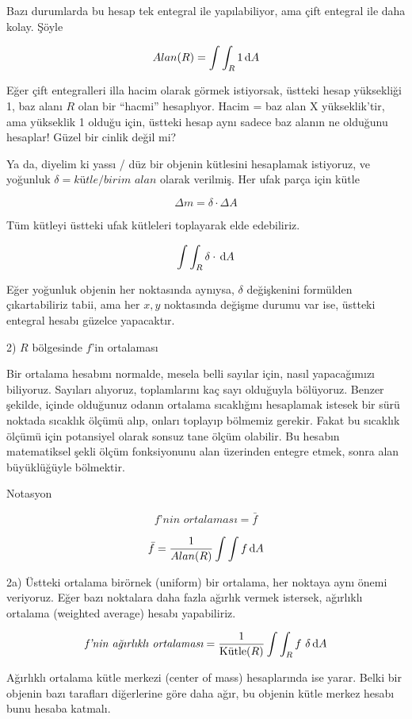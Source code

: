 \documentclass[12pt,fleqn]{article}\usepackage{../../common}
\begin{document}
Bazı durumlarda bu hesap tek entegral ile yapılabiliyor, ama çift entegral ile
daha kolay. Şöyle

$$ Alan(R) = \int \int_R 1 \,\mathrm{d} A $$

Eğer çift entegralleri illa hacim olarak görmek istiyorsak, üstteki hesap
yüksekliği 1, baz alanı $R$ olan bir ``hacmi'' hesaplıyor. Hacim = baz alan X
yükseklik'tir, ama yükseklik 1 olduğu için, üstteki hesap aynı sadece baz alanın
ne olduğunu hesaplar! Güzel bir cinlik değil mi?

Ya da, diyelim ki yassı / düz bir objenin kütlesini hesaplamak istiyoruz, ve
yoğunluk $\delta = \textit{kütle} / \textit{birim alan}$ olarak verilmiş. Her
ufak parça için kütle

$$ \Delta m = \delta \cdot \Delta A $$

Tüm kütleyi üstteki ufak kütleleri toplayarak elde edebiliriz. 

$$ \int \int_R \delta \cdot \,\mathrm{d} A $$

Eğer yoğunluk objenin her noktasında aynıysa, $\delta$ değişkenini
formülden çıkartabiliriz tabii, ama her $x,y$ noktasında değişme durumu var
ise, üstteki entegral hesabı güzelce yapacaktır.

2) $R$ bölgesinde $f$'in ortalaması 

Bir ortalama hesabını normalde, mesela belli sayılar için, nasıl
yapacağımızı biliyoruz. Sayıları alıyoruz, toplamlarını kaç sayı olduğuyla
bölüyoruz. Benzer şekilde, içinde olduğunuz odanın ortalama sıcaklığını
hesaplamak istesek bir sürü noktada sıcaklık ölçümü alıp, onları toplayıp
bölmemiz gerekir. Fakat bu sıcaklık ölçümü için potansiyel olarak sonsuz
tane ölçüm olabilir. Bu hesabın matematiksel şekli ölçüm fonksiyonunu alan
üzerinden entegre etmek, sonra alan büyüklüğüyle bölmektir. 

Notasyon

$$ \textit{f'nin ortalaması} = \bar{f} $$

$$ \bar{f} = \frac{1}{Alan(R)} \int \int f \,\mathrm{d} A $$

2a) Üstteki ortalama birörnek (uniform) bir ortalama, her noktaya
aynı önemi veriyoruz. Eğer bazı noktalara daha fazla ağırlık vermek
istersek, ağırlıklı ortalama (weighted average) hesabı yapabiliriz.

$$ 
\textit{f'nin ağırlıklı ortalaması} = \frac{1}{\textrm{Kütle}(R)} 
\int \int_R f \ \delta \,\mathrm{d} A
$$

Ağırlıklı ortalama kütle merkezi (center of mass) hesaplarında ise
yarar. Belki bir objenin bazı tarafları diğerlerine göre daha ağır, bu
objenin kütle merkez hesabı bunu hesaba katmalı. 
\end{document}
